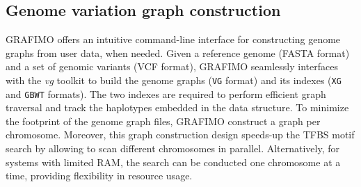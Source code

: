 \documentclass[a4paper, titlepage, openright]{book}
\newcommand{\grafimo}{GRAFIMO\xspace}
\begin{document}
\subsection{Genome variation graph construction}
\grafimo offers an intuitive command-line interface for constructing genome graphs from user data, when needed. Given a reference genome (FASTA format) and a set of genomic variants (VCF format), \grafimo seamlessly interfaces with the \emph{vg} toolkit to build the genome graphs (\texttt{VG} format) and its indexes (\texttt{XG} \citep{garrison2018variation} and \texttt{GBWT} \citep{siren2020haplotype, novak2017graph} formats). The two indexes are required to perform efficient graph traversal and track the haplotypes embedded in the data structure. To minimize the footprint of the genome graph files, \grafimo construct a graph per chromosome. Moreover, this graph construction design speeds-up the TFBS motif search by allowing to scan different chromosomes in parallel. Alternatively, for systems with limited RAM, the search can be conducted one chromosome at a time, providing flexibility in resource usage.

\end{document}
